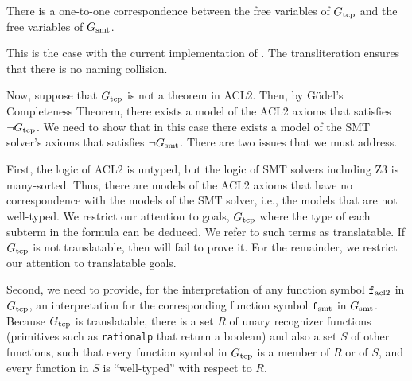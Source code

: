 \begin{assumption}
  There is a one-to-one correspondence between the free variables of $G_{\mathrm{tcp}}$
  and the free variables of $G_{\mathrm{smt}}$.
\end{assumption}
This is the case with the current implementation of \smtlink{}. The
transliteration ensures that there is no naming collision.

Now, suppose that $G_{\mathrm{tcp}}$ is not a theorem in ACL2.  Then, by G\"{o}del's
Completeness Theorem, there exists a model of the ACL2 axioms that
satisfies $\neg G_{\mathrm{tcp}}$. We need to show that in this case there exists a model
of the \acs{SMT} solver's axioms that satisfies $\neg G_{\mathrm{smt}}$. There are two
issues that we must address.

First, the logic of ACL2 is untyped, but the logic of SMT solvers
including Z3 is many-sorted. Thus, there are models of the ACL2
axioms that have no correspondence with the models of the SMT solver, i.e., the
models that are not well-typed. We restrict our attention to goals, $G_{\mathrm{tcp}}$ where
the type of each subterm in the formula can be deduced.
We refer to such terms as translatable. If $G_{\mathrm{tcp}}$ is not translatable, then
\smtlink{} will fail to prove it. For the remainder, we restrict our attention
to translatable goals.

Second, we need to provide, for the interpretation of any function symbol
$\mathtt{f}_{\mathrm{acl2}}$ in $G_{\mathrm{tcp}}$, an interpretation for the corresponding function symbol
$\mathtt{f}_{\mathrm{smt}}$ in $G_{\mathrm{smt}}$.
Because $G_{\mathrm{tcp}}$ is translatable, there is a set $R$ of unary recognizer functions
(primitives such as \texttt{rationalp} that return a boolean) and also a set $S$
of other functions, such that every function symbol in $G_{\mathrm{tcp}}$ is a member of $R$
or of $S$, and every function in $S$ is ``well-typed'' with respect to $R$.

